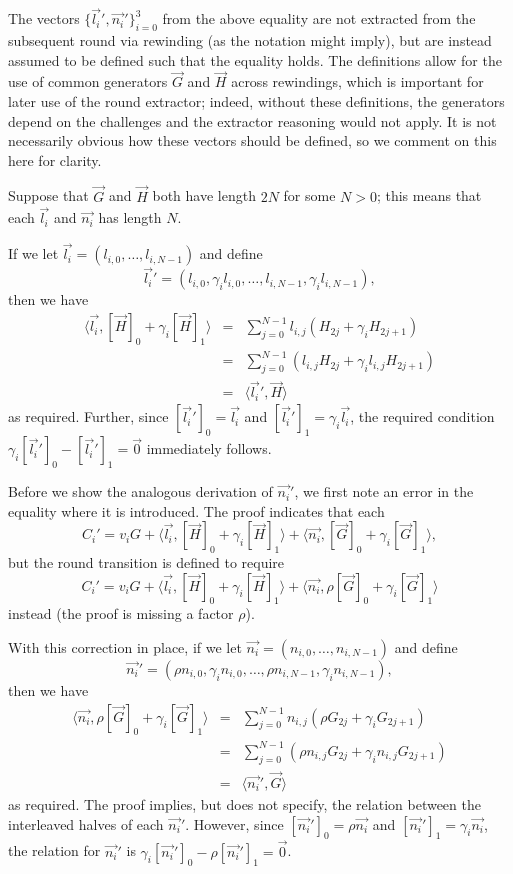 \documentclass{article}
\begin{document}
The vectors $\{\vec{l_i}', \vec{n_i}'\}_{i=0}^3$ from the above equality are not extracted from the subsequent round via rewinding (as the notation might imply), but are instead assumed to be defined such that the equality holds.
The definitions allow for the use of common generators $\vec{G}$ and $\vec{H}$ across rewindings, which is important for later use of the round extractor; indeed, without these definitions, the generators depend on the challenges and the extractor reasoning would not apply.
It is not necessarily obvious how these vectors should be defined, so we comment on this here for clarity.

Suppose that $\vec{G}$ and $\vec{H}$ both have length $2N$ for some $N > 0$; this means that each $\vec{l_i}$ and $\vec{n_i}$ has length $N$.

If we let $\vec{l_i} = (l_{i,0}, \ldots, l_{i,N-1})$ and define
$$\vec{l_i}' = (l_{i,0}, \gamma_i l_{i,0}, \ldots, l_{i,N-1}, \gamma_i l_{i,N-1}),$$
then we have
\begin{eqnarray*}
	\langle \vec{l_i}, [\vec{H}]_0 + \gamma_i [\vec{H}]_1 \rangle &=& \sum_{j=0}^{N-1} l_{i,j} (H_{2j} + \gamma_i H_{2j+1}) \\
	&=& \sum_{j=0}^{N-1} ( l_{i,j} H_{2j} + \gamma_i l_{i,j} H_{2j+1}) \\
	&=& \langle \vec{l_i}', \vec{H} \rangle
\end{eqnarray*}
as required.
Further, since $[\vec{l_i}']_0 = \vec{l_i}$ and $[\vec{l_i}']_1 = \gamma_i \vec{l_i}$, the required condition $\gamma_i [\vec{l_i}']_0 - [\vec{l_i}']_1 = \vec{0}$ immediately follows.

Before we show the analogous derivation of $\vec{n_i}'$, we first note an error in the equality where it is introduced.
The proof indicates that each
$$C_i' = v_i G + \langle \vec{l_i}, [\vec{H}]_0 + \gamma_i [\vec{H}]_1 \rangle + \langle \vec{n_i}, [\vec{G}]_0 + \gamma_i [\vec{G}]_1 \rangle,$$
but the round transition is defined to require
$$C_i' = v_i G + \langle \vec{l_i}, [\vec{H}]_0 + \gamma_i [\vec{H}]_1 \rangle + \langle \vec{n_i}, \rho [\vec{G}]_0 + \gamma_i [\vec{G}]_1 \rangle$$
instead (the proof is missing a factor $\rho$).

With this correction in place, if we let $\vec{n_i} = (n_{i,0}, \ldots, n_{i,N-1})$ and define
$$\vec{n_i}' = (\rho n_{i,0}, \gamma_i n_{i,0}, \ldots, \rho n_{i,N-1}, \gamma_i n_{i,N-1}),$$
then we have
\begin{eqnarray*}
	\langle \vec{n_i}, \rho [\vec{G}]_0 + \gamma_i [\vec{G}]_1 \rangle &=& \sum_{j=0}^{N-1} n_{i,j} (\rho G_{2j} + \gamma_i G_{2j+1}) \\
	&=& \sum_{j=0}^{N-1} (\rho n_{i,j} G_{2j} + \gamma_i n_{i,j} G_{2j+1}) \\
	&=& \langle \vec{n_i}', \vec{G} \rangle
\end{eqnarray*}
as required.
The proof implies, but does not specify, the relation between the interleaved halves of each $\vec{n_i}'$.
However, since $[\vec{n_i}']_0 = \rho \vec{n_i}$ and $[\vec{n_i}']_1 = \gamma_i \vec{n_i}$, the relation for $\vec{n_i}'$ is $\gamma_i [\vec{n_i}']_0 - \rho [\vec{n_i}']_1 = \vec{0}$.
\end{document}
